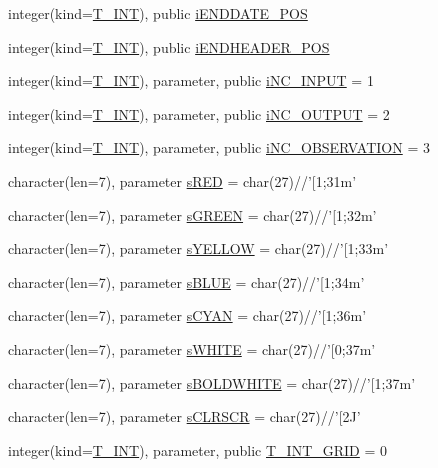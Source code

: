\begin{DoxyCompactItemize}
\item 
integer(kind=\hyperlink{namespacetest_a6f91ebd89b58cfcc5da99faed9385c1e}{T\_\-INT}), public \hyperlink{namespacetest_af29dc757927589439e32db648cb927b9}{iENDDATE\_\-POS}
\item 
integer(kind=\hyperlink{namespacetest_a6f91ebd89b58cfcc5da99faed9385c1e}{T\_\-INT}), public \hyperlink{namespacetest_ae27eee462dde556ad327a954598ee9de}{iENDHEADER\_\-POS}
\item 
integer(kind=\hyperlink{namespacetest_a6f91ebd89b58cfcc5da99faed9385c1e}{T\_\-INT}), parameter, public \hyperlink{namespacetest_a47a3dcd6434015912debe4d7c32a6696}{iNC\_\-INPUT} = 1
\item 
integer(kind=\hyperlink{namespacetest_a6f91ebd89b58cfcc5da99faed9385c1e}{T\_\-INT}), parameter, public \hyperlink{namespacetest_a0201f90a40599962ba9f170b55b2940b}{iNC\_\-OUTPUT} = 2
\item 
integer(kind=\hyperlink{namespacetest_a6f91ebd89b58cfcc5da99faed9385c1e}{T\_\-INT}), parameter, public \hyperlink{namespacetest_a6a723368a0f10bdf178fcec29f827e5d}{iNC\_\-OBSERVATION} = 3
\item 
character(len=7), parameter \hyperlink{namespacetest_ad68d7758d8be0c0e11554d320e7fe361}{sRED} = char(27)//'\mbox{[}1;31m'
\item 
character(len=7), parameter \hyperlink{namespacetest_a51f6a60bb17f75fd328f4ebec7c8fdc9}{sGREEN} = char(27)//'\mbox{[}1;32m'
\item 
character(len=7), parameter \hyperlink{namespacetest_ae3efae673a64050b6961fb4a43eafe2f}{sYELLOW} = char(27)//'\mbox{[}1;33m'
\item 
character(len=7), parameter \hyperlink{namespacetest_a67805434e80e529c4296afa41874d705}{sBLUE} = char(27)//'\mbox{[}1;34m'
\item 
character(len=7), parameter \hyperlink{namespacetest_adc949307b4c1c64ca9c4680cb1772584}{sCYAN} = char(27)//'\mbox{[}1;36m'
\item 
character(len=7), parameter \hyperlink{namespacetest_adda4462ac95858ee3e499e1f721f4cb9}{sWHITE} = char(27)//'\mbox{[}0;37m'
\item 
character(len=7), parameter \hyperlink{namespacetest_a30a237c02c2640389d102030736a9a64}{sBOLDWHITE} = char(27)//'\mbox{[}1;37m'
\item 
character(len=7), parameter \hyperlink{namespacetest_a9400b0462b1b2636c59786f754d01c32}{sCLRSCR} = char(27)//'\mbox{[}2J'
\item 
integer(kind=\hyperlink{namespacetest_a6f91ebd89b58cfcc5da99faed9385c1e}{T\_\-INT}), parameter, public \hyperlink{namespacetest_a6b23ea23fb5d02c95f52b7d39ab348fe}{T\_\-INT\_\-GRID} = 0

\end{DoxyCompactItemize}

